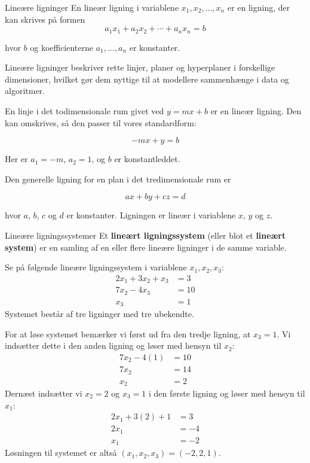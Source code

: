 \begin{definition}{Lineære ligninger} En lineær ligning i variablene $x_1, x_2, \ldots, x_n$ er en ligning, der kan skrives på formen
\[
a_1 x_1 + a_2 x_2 + \cdots + a_n x_n = b
\]

hvor $b$ og koefficienterne $a_1, \ldots, a_n$ er konstanter.

\end{definition}

Lineære ligninger beskriver rette linjer, planer og hyperplaner i forskellige dimensioner, hvilket gør dem nyttige til at modellere sammenhænge i data og algoritmer.

\begin{example} En linje i det todimensionale rum givet ved $y = m x + b$ er en lineær ligning. Den kan omskrives, så den passer til vores standardform:

    \[
-m x+y=b
    \]

Her er $a_1 = -m$, $a_2 = 1$, og $b$ er konstantleddet. \end{example}

\begin{example} Den generelle ligning for en plan i det tredimensionale rum er

\[
a x+b y+c z=d
\]

hvor $a$, $b$, $c$ og $d$ er konstanter. Ligningen er lineær i variablene $x$, $y$ og $z$.
\end{example}

\begin{definition}{Lineære ligningssystemer} Et \textbf{lineært ligningssystem} (eller blot et \textbf{lineært system}) er en samling af en eller flere lineære ligninger i de samme variable. \end{definition}

\begin{example} Se på følgende lineære ligningssystem i variablene $x_1, x_2, x_3$:
\[
\begin{aligned}
2x_1 + 3x_2 + x_3 &= 3 \\
7x_2 - 4x_3 &= 10 \\
x_3 &= 1
\end{aligned}
\]
Systemet består af tre ligninger med tre ubekendte.

\end{example}

For at løse systemet bemærker vi først ud fra den tredje ligning, at $x_3 = 1$. Vi indsætter dette i den anden ligning og løser med hensyn til $x_2$:
\[
\begin{aligned}
7x_2 - 4(1) &= 10 \\
7x_2 &= 14 \\
x_2 &= 2
\end{aligned}
\]
Dernæst indsætter vi $x_2 = 2$ og $x_3 = 1$ i den første ligning og løser med hensyn til $x_1$:
\[
\begin{aligned}
2x_1 + 3(2) + 1 &= 3 \\
2x_1 &= -4 \\
x_1 &= -2
\end{aligned}
\]
Løsningen til systemet er altså $\left(x_1, x_2, x_3\right) = (-2, 2, 1)$.

